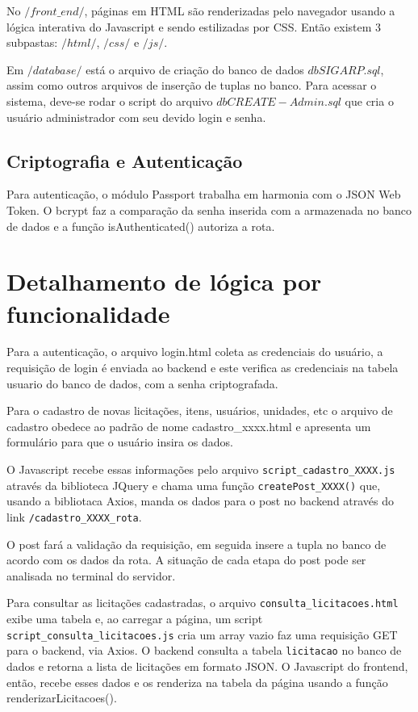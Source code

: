 \documentclass[ ]{article}
\begin{document}
			No $/front\_end/$, páginas em HTML são renderizadas pelo navegador usando a lógica interativa do Javascript e sendo estilizadas por CSS. Então existem 3 subpastas: $/html/$, $/css/$ e $/js/$.
			
			Em $/database/$ está o arquivo de criação do banco de dados $dbSIGARP.sql$, assim como outros arquivos de inserção de tuplas no banco. Para acessar o sistema, deve-se rodar o script do arquivo $dbCREATE-Admin.sql$ que cria o usuário administrador com seu devido login e senha.
			
			
		\subsection{Criptografia e Autenticação}
		Para autenticação, o módulo Passport trabalha em harmonia com o JSON Web Token. O bcrypt faz a comparação da senha inserida com a armazenada no banco de dados e a função isAuthenticated() autoriza a rota.

	\section{Detalhamento de lógica por funcionalidade}
		Para a autenticação, o arquivo login.html coleta as credenciais do usuário, a requisição de login é enviada ao backend e este verifica as credenciais na tabela usuario do banco de dados, com a senha criptografada.
		
		Para o cadastro de novas licitações, itens, usuários, unidades, etc o arquivo de cadastro obedece ao padrão de nome cadastro\_xxxx.html e apresenta um formulário para que o usuário insira os dados.%
		
		O Javascript recebe essas informações pelo arquivo \texttt{script\_cadastro\_XXXX.js} através da biblioteca JQuery e chama uma função \texttt{createPost\_XXXX()} que, usando a bibliotaca Axios, manda os dados para o post no backend através do link \texttt{/cadastro\_XXXX\_rota}.
		
		O post fará a validação da requisição, em seguida insere a tupla no banco de acordo com os dados da rota. A situação de cada etapa do post pode ser analisada no terminal do servidor.
		
		Para consultar as licitações cadastradas, o arquivo \texttt{consulta\_licitacoes.html} exibe uma tabela e, ao carregar a página, um script \texttt{script\_consulta\_licitacoes.js} cria um array vazio faz uma requisição GET para o backend, via Axios. O backend consulta a tabela \texttt{licitacao} no banco de dados e retorna a lista de licitações em formato JSON. O Javascript do frontend, então, recebe esses dados e os renderiza na tabela da página usando a função renderizarLicitacoes().
		
\end{document}
